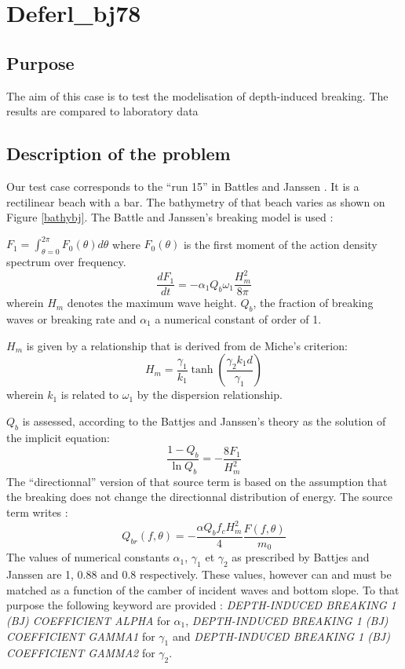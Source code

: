 \section{Deferl\_bj78}
%

%
\subsection{Purpose}
%
The aim of this case is to test the modelisation of depth-induced breaking. The
results are compared to laboratory data \cite{Battjes1978}
%
\subsection{Description of the problem}
%
Our test case corresponds to the ``run 15'' in Battles and Janssen
\cite{Battjes1978}. It is a rectilinear beach with a bar. The bathymetry of that
beach varies as shown on Figure \ref{bathybj}. The Battle and Janssen's
breaking model is used :

$ F_1=\int_{\theta=0}^{2\pi}F_0(\theta) d\theta$ where $F_0(\theta)$ is the
first moment of the action density spectrum over frequency.
$$
\frac{dF_1}{dt}=-\alpha_1Q_b\omega_1\frac{H_m^2}{8\pi}
$$
wherein $H_m$ denotes the maximum wave height. $Q_b$, the fraction of breaking
waves or breaking rate and $\alpha_1$ a numerical constant of order of 1.

$H_m$ is given by a relationship that is derived from de Miche's criterion:
$$
H_m=\frac{\gamma_1}{k_1}\tanh\left(\frac{\gamma_2k_1d}{\gamma_1} \right)
$$
wherein $k_1$ is related to $\omega_1$ by the dispersion relationship.

$Q_b$ is assessed, according to the Battjes and Janssen's theory as the
solution of the implicit equation:
$$
\frac{1-Q_b}{\ln Q_b}=-\frac{8F_1}{H_m^2}
$$
The ``directionnal'' version of that source term is based on the assumption
that the breaking does not change the directionnal distribution of energy. The
source term writes :
$$
Q_{br}(f,\theta)=- \frac{\alpha Q_bf_cH^2_m}{4}\frac{F(f,\theta)}{m_0}
$$
The values of numerical constants $\alpha_1$, $\gamma_1$ et $\gamma_2$ as
prescribed by Battjes and Janssen are 1, 0.88 and 0.8 respectively. These
values, however can and must be matched as a function of the camber of incident
waves and bottom slope. To that purpose the following keyword are provided :
{\it DEPTH-INDUCED BREAKING 1 (BJ) COEFFICIENT ALPHA} for $\alpha_1$, {\it
DEPTH-INDUCED BREAKING 1 (BJ) COEFFICIENT GAMMA1} for $\gamma_1$ and {\it
DEPTH-INDUCED BREAKING 1 (BJ) COEFFICIENT GAMMA2} for $\gamma_2$.

